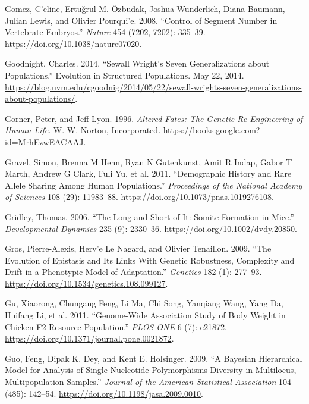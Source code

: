 \documentclass[
]{book}
\newlength{\cslhangindent}
\newlength{\cslentryspacingunit} %
\newenvironment{CSLReferences}[2] %
 {%
  \setlength{\parindent}{0pt}
  \ifodd #1
  \let\oldpar\par
  \def\par{\hangindent=\cslhangindent\oldpar}
  \fi
  \setlength{\parskip}{#2\cslentryspacingunit}
 }%
 {}
\begin{document}
\begin{CSLReferences}{1}{0}
\leavevmode{}%
Gomez, C'eline, Ertuğrul M. Özbudak, Joshua Wunderlich, Diana Baumann, Julian Lewis, and Olivier Pourqui'e. 2008. {``Control of Segment Number in Vertebrate Embryos.''} \emph{Nature} 454 (7202, 7202): 335--39. \url{https://doi.org/10.1038/nature07020}.

\leavevmode{}%
Goodnight, Charles. 2014. {``Sewall {Wright}'s {Seven Generalizations} about {Populations}.''} {Evolution in Structured Populations}. May 22, 2014. \url{https://blog.uvm.edu/cgoodnig/2014/05/22/sewall-wrights-seven-generalizations-about-populations/}.

\leavevmode{}%
Gorner, Peter, and Jeff Lyon. 1996. \emph{Altered {Fates}: {The Genetic Re-Engineering} of {Human Life}}. {W. W. Norton, Incorporated}. \url{https://books.google.com?id=MrhEzwEACAAJ}.

\leavevmode{}%
Gravel, Simon, Brenna M Henn, Ryan N Gutenkunst, Amit R Indap, Gabor T Marth, Andrew G Clark, Fuli Yu, et al. 2011. {``Demographic History and Rare Allele Sharing Among Human Populations.''} \emph{Proceedings of the National Academy of Sciences} 108 (29): 11983--88. \url{https://doi.org/10.1073/pnas.1019276108}.

\leavevmode{}%
Gridley, Thomas. 2006. {``The Long and Short of It: {Somite} Formation in Mice.''} \emph{Developmental Dynamics} 235 (9): 2330--36. \url{https://doi.org/10.1002/dvdy.20850}.

\leavevmode{}%
Gros, Pierre-Alexis, Herv'e Le Nagard, and Olivier Tenaillon. 2009. {``The {Evolution} of {Epistasis} and {Its Links With Genetic Robustness}, {Complexity} and {Drift} in a {Phenotypic Model} of {Adaptation}.''} \emph{Genetics} 182 (1): 277--93. \url{https://doi.org/10.1534/genetics.108.099127}.

\leavevmode{}%
Gu, Xiaorong, Chungang Feng, Li Ma, Chi Song, Yanqiang Wang, Yang Da, Huifang Li, et al. 2011. {``Genome-{Wide Association Study} of {Body Weight} in {Chicken F2 Resource Population}.''} \emph{PLOS ONE} 6 (7): e21872. \url{https://doi.org/10.1371/journal.pone.0021872}.

\leavevmode{}%
Guo, Feng, Dipak K. Dey, and Kent E. Holsinger. 2009. {``A {Bayesian Hierarchical Model} for {Analysis} of {Single-Nucleotide Polymorphisms Diversity} in {Multilocus}, {Multipopulation Samples}.''} \emph{Journal of the American Statistical Association} 104 (485): 142--54. \url{https://doi.org/10.1198/jasa.2009.0010}.


\end{CSLReferences}
\end{document}
